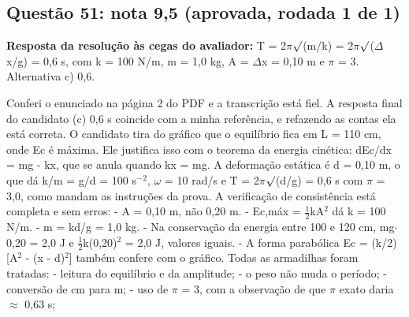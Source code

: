 \documentclass{article}%
\begin{document}
\subsection*{Questão 51: nota 9,5 (aprovada, rodada 1 de 1)}%
\textbf{Resposta da resolução às cegas do avaliador:} T = 2$\pi$$\surd$(m/k) = 2$\pi$$\surd$($\Delta$x/g) = 0,6 s, com k = 100 N/m, m = 1,0 kg, A = $\Delta$x = 0,10 m e $\pi$ = 3. Alternativa c) 0,6.\par %
Conferi o enunciado na página 2 do PDF e a transcrição está fiel. A resposta final do candidato (c) 0,6 s coincide com a minha referência, e refazendo as contas ela está correta.\newline%
\newline%
O candidato tira do gráfico que o equilíbrio fica em L = 110 cm, onde Ec é máxima. Ele justifica isso com o teorema da energia cinética: dEc/dx = mg - kx, que se anula quando kx = mg. A deformação estática é d = 0,10 m, o que dá k/m = g/d = 100 s$^{-}$$^2$, $\omega$ = 10 rad/s e T = 2$\pi$$\surd$(d/g) = 0,6 s com $\pi$ = 3,0, como mandam as instruções da prova.\newline%
\newline%
A verificação de consistência está completa e sem erros:\newline%
{-} A = 0,10 m, não 0,20 m.\newline%
{-} Ec,máx = $\frac12$kA$^2$ dá k = 100 N/m.\newline%
{-} m = kd/g = 1,0 kg.\newline%
{-} Na conservação da energia entre 100 e 120 cm, mg$\cdot$0,20 = 2,0 J e $\frac12$k(0,20)$^2$ = 2,0 J, valores iguais.\newline%
{-} A forma parabólica Ec = (k/2){[}A$^2$ - (x - d)$^2${]} também confere com o gráfico.\newline%
\newline%
Todas as armadilhas foram tratadas:\newline%
{-} leitura do equilíbrio e da amplitude;\newline%
{-} o peso não muda o período;\newline%
{-} conversão de cm para m;\newline%
{-} uso de $\pi$ = 3, com a observação de que $\pi$ exato daria $\approx$ 0,63 s;\newline%
\end{document}
